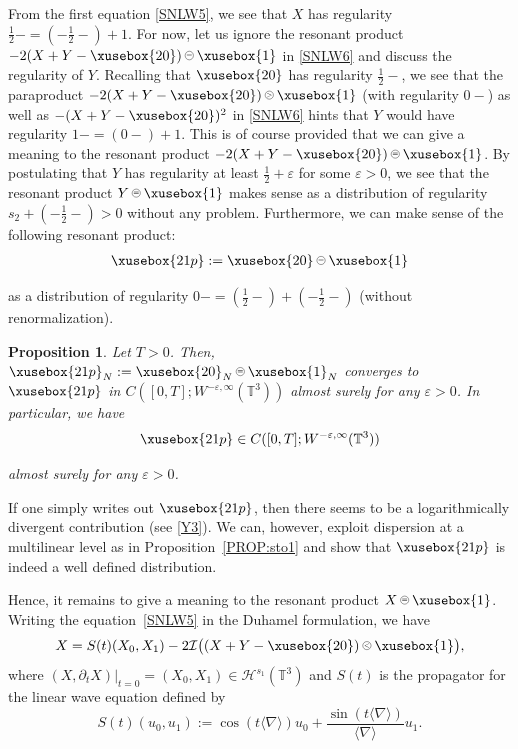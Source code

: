 \documentclass[%
11pt,  reqno]{amsart}
\def\<#1>{\xusebox{#1}}
\newcommand{\pe}{\mathbin{\scaleobj{0.7}{\tikz \draw (0,0) node[shape=circle,draw,inner sep=0pt,minimum size=8.5pt] {\scriptsize  $=$};}}}
\newcommand{\pl}{\mathbin{\scaleobj{0.7}{\tikz \draw (0,0) node[shape=circle,draw,inner sep=0pt,minimum size=8.5pt] {\scriptsize $<$};}}}
\newcommand{\pg}{\mathbin{\scaleobj{0.7}{\tikz \draw (0,0) node[shape=circle,draw,inner sep=0pt,minimum size=8.5pt] {\scriptsize $>$};}}}
\newtheorem{proposition}[theorem]{Proposition}
\newcommand{\1}{\hspace{0.2mm}\text{I}\hspace{0.2mm}}
\newcommand{\noi}{\noindent}
\newcommand{\T}{\mathbb{T}}
\newcommand{\nb}{\nabla}
\newcommand{\eps}{\varepsilon}
\newcommand{\dt}{\partial_t}
\newcommand{\jb}[1]
{\langle #1 \rangle}
\renewcommand{\H}{\mathcal{H}}
\newcommand{\I}{\mathcal{I}}
\numberwithin{equation}{section}
\numberwithin{theorem}{section}
\begin{document}
From  the first equation  \eqref{SNLW5}, 
we see that
 $X$ has regularity $\frac 12- = (-\frac{1}{2}-) + 1$.
%
For now, let us ignore the resonant product 
$-2(X+Y-\<20>)\pe \<1>$ in \eqref{SNLW6}
and discuss the regularity of $Y$.
Recalling that $\<20>$ has regularity $\frac 12-$, 
we see that 
the paraproduct 
$- 2(X+Y-\<20>)\pg \<1>$ (with regularity $0-$)
as well as $- (X+Y-\<20>)^2 $ in \eqref{SNLW6} 
hints that $Y$ would have regularity $1- = (0-) + 1$.
This  is of course
provided that we can give a meaning
to the resonant product 
$-2(X+Y-\<20>)\pe \<1>$.
By postulating that $Y$ has regularity at least $\frac 12+\eps$ for some $\eps > 0$, 
we see that the resonant product 
$Y\pe \<1>$ makes sense as a distribution of regularity $s_2+( - \frac 12 -) > 0$
without any problem.
Furthermore, we can  make sense
of the following resonant product:
\begin{align}
\<21p> := \<20>\pe \<1>
\label{soX}
\end{align}


\noi
as a distribution of regularity $0- = (\frac{1}{2}-) + (-\frac 12 -)$
(without renormalization).


\begin{proposition}\label{PROP:sto2}
Let   $T >0$.
Then, 
$\<21p>_N := \<20>_N\pe \<1>_N$
 converges to $\<21p>$
 in 
$C([0,T];W^{ -\eps,\infty}(\T^3))$
almost surely
for any  $\eps > 0$.
 In particular, we have
  \[\<21p> \in C([0,T];W^{ -\eps,\infty}(\T^3))\]
  
  \noi
  almost surely  for any  $\eps > 0$.
\end{proposition}


If one simply writes out  $\<21p>$,  
then there seems to be a logarithmically divergent contribution
(see \eqref{Y3}).
We can, however, exploit dispersion at a multilinear level
as in Proposition~\ref{PROP:sto1}
and show that  $\<21p>$ is indeed a well defined distribution.




Hence, it remains to give a meaning
to the resonant product $X\pe \<1>$.
Writing 
the equation~\eqref{SNLW5}
in the Duhamel formulation, 
we have
\begin{align}
 X  = S(t) (X_0, X_1) -2\I \big((X+Y-\<20>)\pl \<1>\big),
\label{X1}
 \end{align}
\noi
where $(X, \dt X )|_{t = 0} = (X_0, X_1) \in \H^{s_1}(\T^3)$ and $S(t)$ is the propagator for the linear wave equation
defined by 
\begin{equation*}
S(t)(u_0, u_1) := \cos(t\jb{\nb})u_0+\frac{\sin (t\jb{\nb})}{\jb{\nb}}u_1.
\end{equation*}
\end{document}
